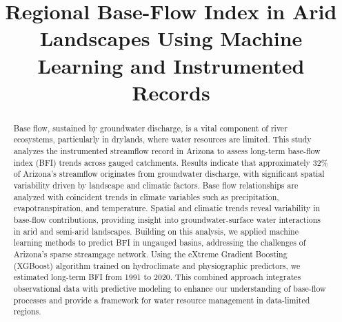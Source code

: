 \documentclass[
]{agujournal2019}
\begin{document}
\title{Regional Base-Flow Index in Arid Landscapes Using Machine
Learning and Instrumented Records}



\begin{abstract}
Base flow, sustained by groundwater discharge, is a vital component of
river ecosystems, particularly in drylands, where water resources are
limited. This study analyzes the instrumented streamflow record in
Arizona to assess long-term base-flow index (BFI) trends across gauged
catchments. Results indicate that approximately 32\% of Arizona's
streamflow originates from groundwater discharge, with significant
spatial variability driven by landscape and climatic factors. Base flow
relationships are analyzed with coincident trends in climate variables
such as precipitation, evapotranspiration, and temperature. Spatial and
climatic trends reveal variability in base-flow contributions, providing
insight into groundwater-surface water interactions in arid and
semi-arid landscapes. Building on this analysis, we applied machine
learning methods to predict BFI in ungauged basins, addressing the
challenges of Arizona's sparse streamgage network. Using the eXtreme
Gradient Boosting (XGBoost) algorithm trained on hydroclimate and
physiographic predictors, we estimated long-term BFI from 1991 to 2020.
This combined approach integrates observational data with predictive
modeling to enhance our understanding of base-flow processes and provide
a framework for water resource management in data-limited regions.
\end{abstract}
\end{document}
